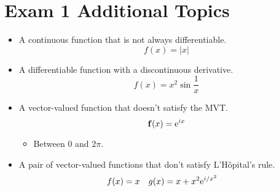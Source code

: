 \documentclass[../notes.tex]{subfiles}
\begin{document}
\section{Exam 1 Additional Topics}
\begin{itemize}
    \item A continuous function that is not always differentiable.
    \begin{equation*}
        f(x) = |x|
    \end{equation*}
    \item A differentiable function with a discontinuous derivative.
    \begin{equation*}
        f(x) = x^2\sin\frac{1}{x}
    \end{equation*}
    \item A vector-valued function that doesn't satisfy the MVT.
    \begin{equation*}
        \mathbf{f}(x) = \e[ix]
    \end{equation*}
    \begin{itemize}
        \item Between $0$ and $2\pi$.
    \end{itemize}
    \item A pair of vector-valued functions that don't satisfy L'H\^{o}pital's rule.
    \begin{align*}
        f(x) &= x&
        g(x) &= x+x^2\e[i/x^2]
    \end{align*}
\end{itemize}
\end{document}
